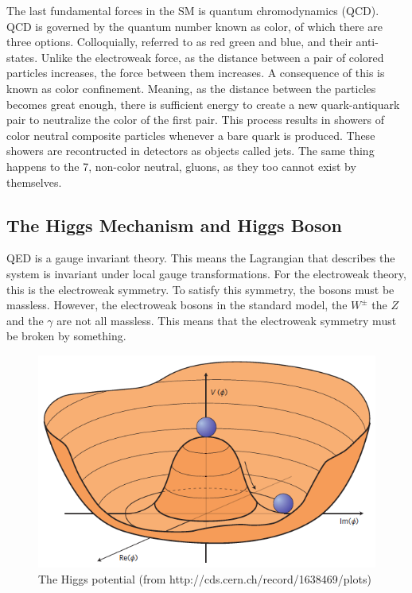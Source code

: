 
The last fundamental forces in the SM is quantum chromodynamics (QCD). QCD is governed by the quantum number known as color, of which there are three options. Colloquially, referred to as red green and blue, and their anti-states. Unlike the electroweak force, as the distance between a pair of colored particles increases, the force between them increases. A consequence of this is known as color confinement. Meaning, as the distance between the particles becomes great enough, there is sufficient energy to create a new quark-antiquark pair to neutralize the color of the first pair. This process results in showers of color neutral composite particles whenever a bare quark is produced. These showers are recontructed in detectors as objects called jets. The same thing happens to the 7, non-color neutral, gluons, as they too cannot exist by themselves.
\subsection{The Higgs Mechanism and Higgs Boson}
\label{ssec:Higgs}
QED is a gauge invariant theory. This means the Lagrangian that describes the system is invariant under local gauge transformations. For the electroweak theory, this is the electroweak symmetry. To satisfy this symmetry, the bosons must be massless. However, the electroweak bosons in the standard model, the ${W^{\pm}}$ the ${Z}$ and the ${\gamma}$ are not all massless. This means that the electroweak symmetry must be broken by something.\linebreak

\begin{figure}[h]
\begin{center}
\includegraphics[scale=0.65]{figures/higgspotential}
\caption{The Higgs potential (from http://cds.cern.ch/record/1638469/plots) }
\label{Fig:higgspot}
\end{center}
\end{figure}

